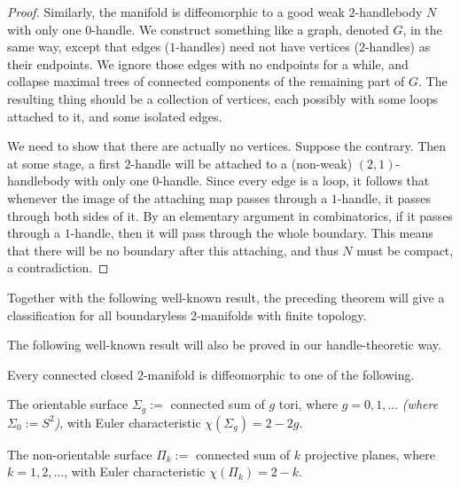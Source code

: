 \begin{proof}
Similarly, the manifold is diffeomorphic to a good weak $2$-handlebody $N$
with only one $0$-handle.
We construct something like a graph, denoted $G$, in the same way,
except that edges ($1$-handles) need not have vertices ($2$-handles) as their endpoints.
We ignore those edges with no endpoints for a while,
and collapse maximal trees of connected components of the remaining part of $G$.
The resulting thing should be a collection of vertices,
each possibly with some loops attached to it,
and some isolated edges.

We need to show that there are actually no vertices.
Suppose the contrary. Then at some stage,
a first $2$-handle will be attached to a (non-weak)
$(2,1)$-handlebody with only one $0$-handle.
Since every edge is a loop, it follows that whenever the image of the attaching map
passes through a $1$-handle, it passes through both sides of it.
By an elementary argument in combinatorics, if it passes through a $1$-handle,
then it will pass through the whole boundary.
This means that there will be no boundary after this attaching,
and thus $N$ must be compact, a contradiction.
\end{proof}

Together with the following well-known result,
the preceding theorem will give a classification for
all boundaryless $2$-manifolds with finite topology.

The following well-known result will also be proved in our handle-theoretic way.

\begin{theorem}
Every connected closed $2$-manifold is diffeomorphic to one of the following.
\begin{enum}
\item The orientable surface $\Sigma_g:=$ connected sum of $g$ tori,
where $g=0,1,\dotsc$ \emph{(where $\Sigma_0:=S^2$)}, with Euler characteristic $\chi(\Sigma_g)=2-2g$.
\item The non-orientable surface $\Pi_k:=$ connected sum of $k$ projective planes,
where $k=1,2,\dotsc$, with Euler characteristic $\chi(\Pi_k)=2-k$.
\end{enum}
\end{theorem}

